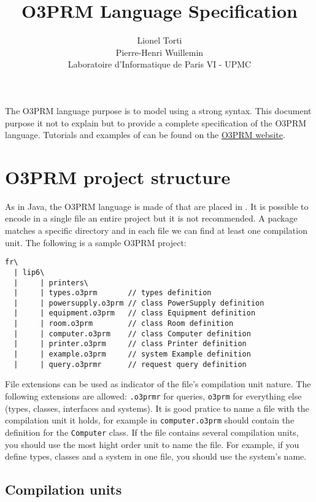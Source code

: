 \documentclass[singlespacing,12pt,a4paper]{article}
\title{O3PRM Language Specification}
\author{Lionel Torti \\ Pierre-Henri Wuillemin \\ Laboratoire d'Informatique de Paris VI - UPMC}
\begin{document}
\maketitle

The O3PRM language purpose is to model \PRMs{} using a strong \oo{} syntax. This
document purpose it not to explain \PRMs{} but to provide a complete
specification of the O3PRM language. Tutorials and examples of \PRMs{} can be
found on the \href{http://o3prm.lip6.fr/}{O3PRM website}.

\section{O3PRM project structure}

As in Java, the O3PRM language is made of  that are placed
in . It is possible to encode in a single file an entire project but
it is not recommended. A package matches a specific directory and in each file
we can find at least one compilation unit. The following is a sample O3PRM
project:

\begin{small}
\begin{verbatim}
fr\
  | lip6\
  |     | printers\
  |     | types.o3prm       // types definition
  |     | powersupply.o3prm // class PowerSupply definition
  |     | equipment.o3prm   // class Equipment definition
  |     | room.o3prm        // class Room definition
  |     | computer.o3prm    // class Computer definition
  |     | printer.o3prm     // class Printer definition
  |     | example.o3prm     // system Example definition
  |     | query.o3prmr      // request query definition
\end{verbatim}
\end{small}

File extensions can be used as indicator of the file's compilation unit nature.
The following extensions are allowed: \verb+.o3prmr+ for queries,  \verb+o3prm+
for everything else (types, classes, interfaces and systems).  It is good
pratice to name a file with the compilation unit it holds, for example in
\verb+computer.o3prm+ should contain the definition for the \verb+Computer+
class. If the file contains several compilation units, you should use the most
hight order unit to name the file. For example, if you define types, classes
and a system in one file, you should use the system's name.

\subsection*{Compilation units}
\end{document}

